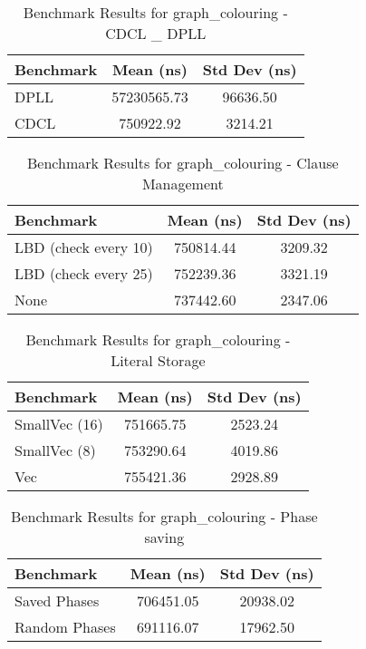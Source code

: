 \begin{table}[h]
    \centering
    \caption{Benchmark Results for graph\_colouring - CDCL \_ DPLL}
    \begin{tabular}{|l|c|c|}
        \hline
        Benchmark & Mean (ns) & Std Dev (ns) \\
        \hline
        DPLL & 57230565.73 & 96636.50 \\
        CDCL & 750922.92 & 3214.21 \\
        \hline
    \end{tabular}
\label{tab:bench-graph_colouring---CDCL-_-DPLL}
\end{table}


\begin{table}[h]
    \centering
    \caption{Benchmark Results for graph\_colouring - Clause Management}
    \begin{tabular}{|l|c|c|}
        \hline
        Benchmark & Mean (ns) & Std Dev (ns) \\
        \hline
        LBD (check every 10) & 750814.44 & 3209.32 \\
        LBD (check every 25) & 752239.36 & 3321.19 \\
        None & 737442.60 & 2347.06 \\
        \hline
    \end{tabular}
\label{tab:bench-graph_colouring---Clause-Management}
\end{table}


\begin{table}[h]
    \centering
    \caption{Benchmark Results for graph\_colouring - Literal Storage}
    \begin{tabular}{|l|c|c|}
        \hline
        Benchmark & Mean (ns) & Std Dev (ns) \\
        \hline
        SmallVec (16) & 751665.75 & 2523.24 \\
        SmallVec (8) & 753290.64 & 4019.86 \\
        Vec & 755421.36 & 2928.89 \\
        \hline
    \end{tabular}
\label{tab:bench-graph_colouring---Literal-Storage}
\end{table}


\begin{table}[h]
    \centering
    \caption{Benchmark Results for graph\_colouring - Phase saving}
    \begin{tabular}{|l|c|c|}
        \hline
        Benchmark & Mean (ns) & Std Dev (ns) \\
        \hline
        Saved Phases & 706451.05 & 20938.02 \\
        Random Phases & 691116.07 & 17962.50 \\
        \hline
    \end{tabular}
\label{tab:bench-graph_colouring---Phase-saving}
\end{table}


